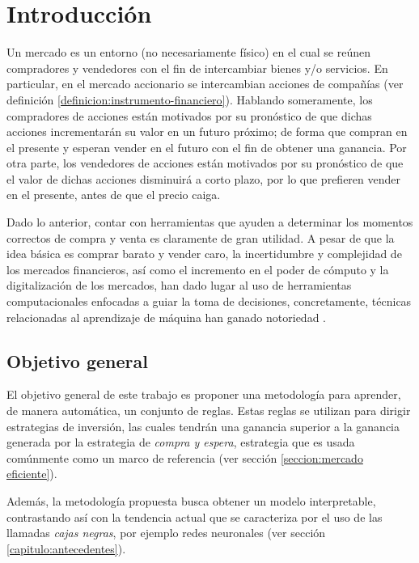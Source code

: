 \documentclass[12pt]{report}
\theoremstyle{break}
\theoremstyle{break}
\begin{document}
\chapter[Capítulo \thechapter: Introducción]{Introducción}
\label{capitulo:introduccion}
Un mercado es un entorno (no necesariamente físico) en el cual se reúnen compradores y vendedores con el fin de intercambiar bienes y/o servicios. En particular, en el mercado accionario se intercambian acciones de compañías (ver definición \ref{definicion:instrumento-financiero}). Hablando someramente, los compradores de acciones están motivados por su pronóstico de que dichas acciones incrementarán su valor en un futuro próximo; de forma que compran en el presente y esperan vender en el futuro
con el fin de obtener una ganancia. Por otra parte, los vendedores de acciones están motivados por su pronóstico de que el valor de dichas acciones disminuirá a corto plazo, por lo que prefieren vender en el presente, antes de que el precio caiga.

Dado lo anterior, contar con herramientas que ayuden a determinar los momentos correctos de compra y venta es claramente de gran utilidad. A pesar de que la idea básica es comprar barato y vender caro, la incertidumbre y complejidad de los mercados financieros, así como el incremento en el poder de cómputo y la digitalización de los mercados, han dado lugar al uso de herramientas computacionales enfocadas a guiar la toma de decisiones, concretamente, técnicas relacionadas al aprendizaje de máquina han ganado notoriedad \cite{AdvancesMLFinance}.

\section{Objetivo general}
\label{seccion:objetivo general}
El objetivo general de este trabajo es proponer una metodología para aprender, de manera automática, un conjunto de reglas. Estas reglas se utilizan para dirigir estrategias de inversión, las cuales tendrán una ganancia superior a la ganancia generada por la estrategia de \textit{compra y espera}, estrategia que es usada comúnmente como un marco de referencia (ver sección \ref{seccion:mercado eficiente}).

Además, la metodología propuesta busca obtener un modelo interpretable, contrastando así con la tendencia actual que se caracteriza por el uso de las llamadas \textit{cajas negras}, por ejemplo redes neuronales (ver sección \ref{capitulo:antecedentes}).
\end{document}
